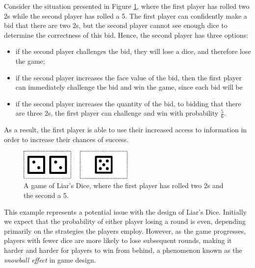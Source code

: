 \begin{example}
\label{cs2:hidden_info_example}

Consider the situation presented in Figure \ref{cs2:uneven_information}, where the first player has rolled two 2s while the second player has rolled a 5. The first player can confidently make a bid that there are two 2s, but the second player cannot see enough dice to determine the correctness of this bid. Hence, the second player has three options:

\begin{itemize}

\item if the second player challenges the bid, they will lose a dice, and therefore lose the game;
\item if the second player increases the face value of the bid, then the first player can immediately challenge the bid and win the game, since each bid will be 
\item if the second player increases the quantity of the bid, to bidding that there are three 2s, the first player can challenge and win with probability $\frac{5}{6}$.

\end{itemize}

As a result, the first player is able to use their increased access to information in order to increase their chances of success.
\end{example}

\begin{figure}[h]
    \centering
    \includegraphics[width=0.5\textwidth]{images/LiarsDice/different_information.pdf}
    \caption{A game of Liar's Dice, where the first player has rolled two 2s and the second a 5.}
    \label{cs2:uneven_information}
    \vspace*{-0.2cm}
\end{figure}

This example represents a potential issue with the design of Liar's Dice. Initially we expect that the probability of either player losing a round is even, depending primarily on the strategies the players employ. However, as the game progresses, players with fewer dice are more likely to lose subsequent rounds, making it harder and harder for players to win from behind, a phenomenon known as the \emph{snowball effect} in game design. 

